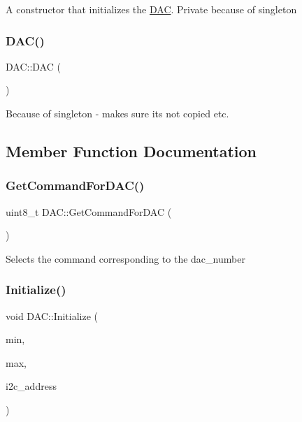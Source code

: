 A constructor that initializes the \hyperlink{class_d_a_c}{D\+AC}. Private because of singleton \hypertarget{class_d_a_c_af656669246f70c7ccbbd05d0e65088d4}{}\label{class_d_a_c_af656669246f70c7ccbbd05d0e65088d4} 
\subsubsection{\texorpdfstring{D\+A\+C()}{DAC()}\hspace{0.1cm}{\footnotesize\ttfamily [2/2]}}
{\footnotesize\ttfamily D\+A\+C\+::\+D\+AC (\begin{DoxyParamCaption}\item[{const \hyperlink{class_d_a_c}{D\+AC} \&}]{ }\end{DoxyParamCaption})\hspace{0.3cm}{\ttfamily [delete]}}

Because of singleton -\/ makes sure its not copied etc. 

\subsection{Member Function Documentation}
\hypertarget{class_d_a_c_a535a7552ff0b9a68af94893a9c17dbed}{}\label{class_d_a_c_a535a7552ff0b9a68af94893a9c17dbed} 
\subsubsection{\texorpdfstring{Get\+Command\+For\+D\+A\+C()}{GetCommandForDAC()}}
{\footnotesize\ttfamily uint8\+\_\+t D\+A\+C\+::\+Get\+Command\+For\+D\+AC (\begin{DoxyParamCaption}{ }\end{DoxyParamCaption})}

Selects the command corresponding to the dac\+\_\+number \hypertarget{class_d_a_c_a6584c17f9f941589a78e806c10386789}{}\label{class_d_a_c_a6584c17f9f941589a78e806c10386789} 
\subsubsection{\texorpdfstring{Initialize()}{Initialize()}}
{\footnotesize\ttfamily void D\+A\+C\+::\+Initialize (\begin{DoxyParamCaption}\item[{uint8\+\_\+t}]{min,  }\item[{uint8\+\_\+t}]{max,  }\item[{uint8\+\_\+t}]{i2c\+\_\+address }\end{DoxyParamCaption})}

